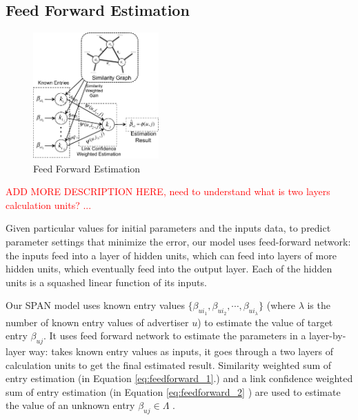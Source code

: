 \documentclass[conference,compsoc]{IEEEtran}
\begin{document}



\subsection{Feed Forward Estimation}
\label{sec:ffe}

\begin{figure}[!ht]
  \centering
  \includegraphics[width=0.43\textwidth]{figures/trainer_feedforward.pdf}
  \caption{Feed Forward Estimation}
  \label{fig:trainer-feedforward}
\end{figure}


\textcolor{red}{ADD MORE DESCRIPTION HERE, need to understand what is two layers calculation units? ...}

Given particular values for initial parameters and  the inputs data,  to predict parameter settings that minimize the error,  our model uses  feed-forward network:  the inputs feed into a layer of hidden units, which can feed into layers of more hidden units, which eventually feed into the output layer. Each of the hidden units is a squashed linear function of its inputs.

Our SPAN model uses known entry values $\{\beta_{ui_1}, \beta_{ui_2}, \cdots, \beta_{ui_\lambda}\}$ (where $\lambda$ is the number of known entry values
of advertiser $u$) to estimate the value of target entry
$\beta_{uj}$.
It uses feed forward network to estimate the parameters  in a layer-by-layer way: takes known entry values as inputs, it goes through a two layers of calculation units to get the final estimated result.  
Similarity weighted sum of entry estimation (in Equation \ref{eq:feedforward_1}.) and a link confidence weighted sum of entry estimation (in 
Equation \ref{eq:feedforward_2} ) are used to estimate the value of an unknown entry $\beta_{uj} \in \Lambda$ .
\end{document}
